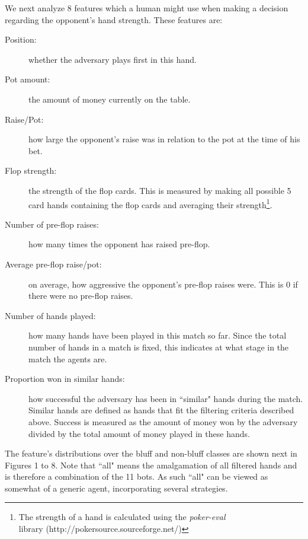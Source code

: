 \documentclass[letterpaper]{article}
\begin{document}
We next analyze 8 features which a human might use when making a decision regarding the opponent's hand strength. These features are:

\begin{description}
  \item[Position:] whether the adversary plays first in this hand.
  \item[Pot amount:] the amount of money currently on the table.
  \item[Raise/Pot:] how large the opponent's raise was in relation to the pot at the time of his bet.
  \item[Flop strength:] the strength of the flop cards. This is measured by making all possible 5 card hands containing the flop cards and averaging their strength\footnote{The strength of a hand is calculated using the \emph{poker-eval}\\ library (http://pokersource.sourceforge.net/)}.
  \item[Number of pre-flop raises:] how many times the opponent has raised pre-flop.
  \item[Average pre-flop raise/pot:] on average, how aggressive the opponent's pre-flop raises were. This is 0 if there were no pre-flop raises.
  \item[Number of hands played:] how many hands have been played in this match so far. Since the total number of hands in a match is fixed, this indicates at what stage in the match the agents are.
  \item[Proportion won in similar hands:] how successful the adversary has been in ``similar" hands during the match. Similar hands are defined as hands that fit the filtering criteria described above. Success is measured as the amount of money won by the adversary divided by the total amount of money played in these hands. 
\end{description}

The feature's distributions over the bluff and non-bluff classes are shown next in Figures 1 to 8. Note that ``all" means the amalgamation of all filtered hands and is therefore a combination of the 11 bots. As such ``all" can be viewed as somewhat of a generic agent, incorporating several strategies.
\end{document}
